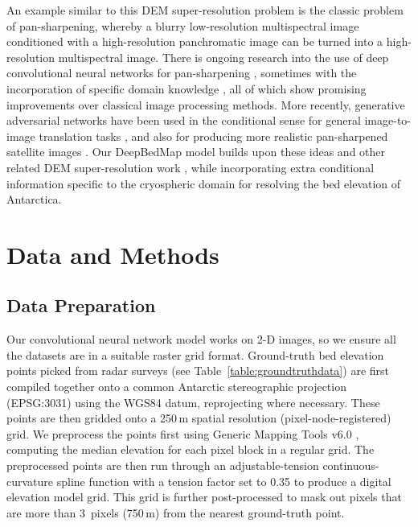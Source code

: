 \documentclass[tc, noline]{copernicus}
\begin{document}
An example similar to this DEM super-resolution problem is the classic problem of pan-sharpening, whereby a blurry low-resolution multispectral image conditioned with a high-resolution panchromatic image can be turned into a high-resolution multispectral image.
There is ongoing research into the use of deep convolutional neural networks for pan-sharpening \citep{MasiPansharpeningConvolutionalNeural2016,ScarpaTargetAdaptiveCNNBasedPansharpening2018}, sometimes with the incorporation of specific domain knowledge \citep{YangPanNetDeepNetwork2017}, all of which show promising improvements over classical image processing methods.
More recently, generative adversarial networks \citep{GoodfellowGenerativeAdversarialNetworks2014} have been used in the conditional sense for general image-to-image translation tasks \citep[e.g.][]{IsolaImagetoImageTranslationConditional2016,ParkSemanticImageSynthesis2019}, and also for producing more realistic pan-sharpened satellite images \citep{LiuPSGANGenerativeAdversarial2018}.
Our DeepBedMap model builds upon these ideas and other related DEM super-resolution work \citep{XuNonlocalsimilaritybased2015,ChenConvolutionalNeuralNetwork2016}, while incorporating extra conditional information specific to the cryospheric domain for resolving the bed elevation of Antarctica.


\section{Data and Methods}

\subsection{Data Preparation} \label{section:datapreparation}

Our convolutional neural network model works on 2-D images, so we ensure all the datasets are in a suitable raster grid format.
Ground-truth bed elevation points picked from radar surveys (see Table~\ref{table:groundtruthdata}) are first compiled together onto a common Antarctic stereographic projection (EPSG:3031) using the WGS84 datum, reprojecting where necessary.
These points are then gridded onto a 250\,\unit{m} spatial resolution (pixel-node-registered) grid.
We preprocess the points first using Generic Mapping Tools v6.0 \citep[GMT6;][]{WesselGenericMappingTools2019}, computing the median elevation for each pixel block in a regular grid.
The preprocessed points are then run through an adjustable-tension continuous-curvature spline function with a tension factor set to 0.35 to produce a digital elevation model grid.
This grid is further post-processed to mask out pixels that are more than 3~\unit{pixels} (750\,\unit{m}) from the nearest ground-truth point.
\end{document}
